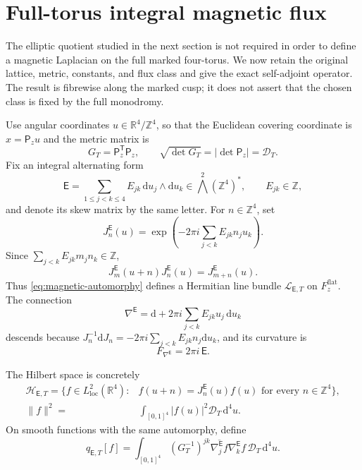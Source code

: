 \documentclass[11pt]{article}
\numberwithin{equation}{section}
\theoremstyle{definition}
\theoremstyle{remark}
\newcommand{\R}{\mathbb R}
\newcommand{\Z}{\mathbb Z}
\newcommand{\dd}{\mathrm d}
\begin{document}
\section{Full-torus integral magnetic flux}

The elliptic quotient studied in the next section is not required in order to
define a magnetic Laplacian on the full marked four-torus.  We now retain the
original lattice, metric, constants, and flux class and give the exact
self-adjoint operator.  The result is fibrewise along the marked cusp; it does
not assert that the chosen class is fixed by the full monodromy.

Use angular coordinates $u\in\R^4/\Z^4$, so that the Euclidean covering
coordinate is $x=\mathsf P_z u$ and the metric matrix is
\begin{equation}\label{eq:magnetic-Gram}
 G_T=\mathsf P_z^{\mathsf T}\mathsf P_z,
 \qquad \sqrt{\det G_T}=|\det\mathsf P_z|=\mathcal D_T.
\end{equation}
Fix an integral alternating form
\begin{equation}\label{eq:integral-flux}
 \mathsf E=\sum_{1\le j<k\le4}E_{jk}\,\dd u_j\wedge\dd u_k
 \in\bigwedge^2(\Z^4)^*,
 \qquad E_{jk}\in\Z,
\end{equation}
and denote its skew matrix by the same letter.  For $n\in\Z^4$, set
\begin{equation}\label{eq:magnetic-automorphy}
 J_n^{\mathsf E}(u)=
 \exp\left(-2\pi i\sum_{j<k}E_{jk}n_j u_k\right).
\end{equation}
Since $\sum_{j<k}E_{jk}m_jn_k\in\Z$,
\[
 J_m^{\mathsf E}(u+n)J_n^{\mathsf E}(u)=J_{m+n}^{\mathsf E}(u).
\]
Thus \eqref{eq:magnetic-automorphy} defines a Hermitian line bundle
$\mathcal L_{\mathsf E,T}$ on $F_z^{\mathrm{flat}}$.  The connection
\begin{equation}\label{eq:magnetic-connection}
 \nabla^{\mathsf E}=\dd+2\pi i
 \sum_{j<k}E_{jk}u_j\,\dd u_k
\end{equation}
descends because
$J_n^{-1}\dd J_n=-2\pi i\sum_{j<k}E_{jk}n_j\dd u_k$, and its curvature is
\begin{equation}\label{eq:magnetic-curvature}
 F_{\nabla^{\mathsf E}}=2\pi i\,\mathsf E.
\end{equation}

The Hilbert space is concretely
\begin{align}
 \mathcal H_{\mathsf E,T}
 =\{f\in L^2_{\mathrm{loc}}(\R^4):{}&
 f(u+n)=J_n^{\mathsf E}(u)f(u)
 \text{ for every }n\in\Z^4\},
 \label{eq:magnetic-Hilbert-space}\\
 \|f\|^2={}&\int_{[0,1]^4}|f(u)|^2\mathcal D_T\,\dd^4u.
 \nonumber
\end{align}
On smooth functions with the same automorphy, define
\begin{equation}\label{eq:magnetic-form}
 q_{\mathsf E,T}[f]=\int_{[0,1]^4}
 (G_T^{-1})^{jk}\overline{\nabla_j^{\mathsf E}f}
 \nabla_k^{\mathsf E}f\,\mathcal D_T\,\dd^4u.
\end{equation}
\end{document}
